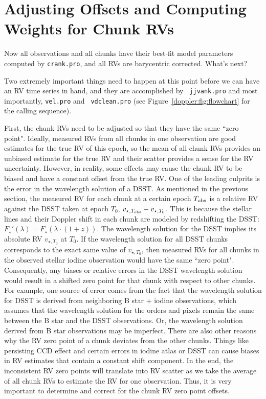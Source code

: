 \section{Adjusting Offsets and Computing Weights for Chunk RVs}\label{doppler:sec:vanking}

Now all observations and all chunks have their best-fit model parameters
computed by {\tt crank.pro}, and all RVs are barycentric
corrected. What's next?

Two extremely important things need to happen at this point before we
can have an RV time series in hand, and they are accomplished by {\tt
  jjvank.pro} and most importantly, {\tt vel.pro} and {\tt
  vdclean.pro} (see Figure~\ref{doppler:fig:flowchart} for the calling
sequence).

First, the chunk RVs need to be
adjusted so that they have the same ``zero point". Ideally, measured
RVs from all chunks in one observation are good estimates for the true
RV of this epoch, so the mean of all chunk RVs provides an unbiased
estimate for the true RV and their scatter provides a sense for the RV
uncertainty. However, in reality, some effects may cause the chunk RV
to be biased and have a constant offset from the true RV. One of the
leading culprits is the error in the wavelength solution of a DSST. As
mentioned in the previous section, the measured RV for each chunk at a
certain epoch $T_{\rm obs}$ is a relative RV against the DSST taken at
epoch $T_0$, $v_{\star, T_{\rm obs}} - v_{\star, T_0}$. This is
because the stellar lines and their Doppler shift in each chunk are
modeled by redshifting the DSST: $F_{\star}'(\lambda) =
F_{\star}(\lambda\cdot(1+z))$. The wavelength solution for the DSST
implies its absolute RV $v_{\star, T_0}$ at $T_0$. If the wavelength
solution for all DSST chunks corresponds to the exact same value of
$v_{\star, T_0}$, then measured RVs for all chunks in the observed
stellar iodine observation would have the same ``zero
point". Consequently, any biases or relative errors in the DSST
wavelength solution would result in a shifted zero point for that
chunk with respect to other chunks. For example, one source of error
comes from the fact that the wavelength solution for DSST is derived
from neighboring B star $+$ iodine observations, which assumes that
the wavelength solution for the orders and pixels remain the same
between the B star and the DSST observations. Or, the wavelength
solution derived from B star observations may be imperfect. There are
also other reasons why the RV zero point of a chunk deviates from the
other chunks. Things like persisting CCD effect  and certain errors in iodine atlas or DSST can cause biases
in RV estimates that contain a constant shift component. In the end,
the inconsistent RV zero points will translate into RV scatter as we
take the average of all chunk RVs to estimate the RV for one
observation. Thus, it is very important to determine and correct for
the chunk RV zero point offsets.

